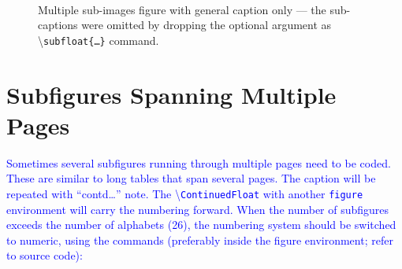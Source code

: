 \documentclass[phd,showgrids]{ndsu-thesis-2022}
\newcommand\italk[1]{\textcolor{blue}{#1}}  %
\newcommand\cmd[1]{\textbackslash\texttt{#1}}  %
\begin{document}
\begin{figure}[H]
\hspace{0.25in}
\hspace{0.25in}
\hspace{0.25in}
\hspace{0.25in}
\hspace{0.25in}\\

\captionsetup{singlelinecheck=false} %
\caption{Multiple sub-images figure with general caption only  --- the sub-captions were omitted by dropping the optional argument as \cmd{subfloat\{\ldots\}} command.} \label{fig6a}
\end{figure}


\section{Subfigures Spanning Multiple Pages}
\italk{Sometimes several subfigures running through multiple pages need to be coded. These are similar to long tables that span several pages. The caption will be repeated with ``contd\ldots'' note. The \cmd{ContinuedFloat} with another \texttt{figure} environment will carry the numbering forward. When the number of subfigures exceeds the number of alphabets (26), the numbering system should be switched to numeric, using the commands (preferably inside the figure environment; refer to source code): }
\end{document}
